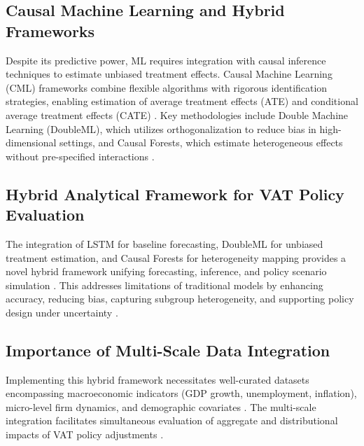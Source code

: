 \subsection*{Causal Machine Learning and Hybrid Frameworks}
Despite its predictive power, ML requires integration with causal inference techniques to estimate unbiased treatment effects. Causal Machine Learning (CML) frameworks combine flexible algorithms with rigorous identification strategies, enabling estimation of average treatment effects (ATE) and conditional average treatment effects (CATE) \citep[section 2.4]{main}. Key methodologies include Double Machine Learning (DoubleML), which utilizes orthogonalization to reduce bias in high-dimensional settings, and Causal Forests, which estimate heterogeneous effects without pre-specified interactions \citep[sec. 4.2, 4.4]{main}.

\subsection*{Hybrid Analytical Framework for VAT Policy Evaluation}
The integration of LSTM for baseline forecasting, DoubleML for unbiased treatment estimation, and Causal Forests for heterogeneity mapping provides a novel hybrid framework unifying forecasting, inference, and policy scenario simulation \citep[section 2.4.2, 4.1]{main}. This addresses limitations of traditional models by enhancing accuracy, reducing bias, capturing subgroup heterogeneity, and supporting policy design under uncertainty \citep[section 1.3]{main}.

\subsection*{Importance of Multi-Scale Data Integration}
Implementing this hybrid framework necessitates well-curated datasets encompassing macroeconomic indicators (GDP growth, unemployment, inflation), micro-level firm dynamics, and demographic covariates \citep[section 3]{main}. The multi-scale integration facilitates simultaneous evaluation of aggregate and distributional impacts of VAT policy adjustments \citep[section 3.8]{main}.

